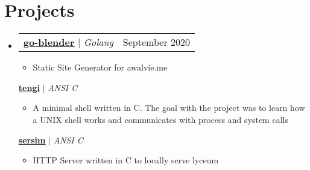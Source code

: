 \documentclass[letterpaper,11pt]{article}
\makeatletter
\newcommand{\resumeItem}[1]{
  \item\small{
    {#1 \vspace{-2pt}}
  }
}
\newcommand{\resumeProjectHeading}[2]{
    \item
    \begin{tabular*}{0.97\textwidth}{l@{\extracolsep{\fill}}r}
      \small#1 & #2 \\
    \end{tabular*}\vspace{-7pt}
}
\newcommand{\resumeSubHeadingListStart}{\begin{itemize}[leftmargin=0.15in, label={}]}
\newcommand{\resumeSubHeadingListEnd}{\end{itemize}}
\newcommand{\resumeItemListStart}{\begin{itemize}}
\newcommand{\resumeItemListEnd}{\end{itemize}\vspace{-5pt}}
\makeatother
\begin{document}
\section{Projects}
    \resumeSubHeadingListStart
	 	  \resumeProjectHeading
		  {\href{https://github.com/awalvie/go-blender}{\underline{\textbf{go-blender}}} $|$ \emph{Golang}}{September 2020}
		  \resumeItemListStart
			\resumeItem{Static Site Generator for awalvie.me}
		  \resumeItemListEnd
		  {\href{https://github.com/awalvie/tengi}{\underline{\textbf{tengi}}} $|$ \emph{ANSI C}}{}
		  \resumeItemListStart
			\resumeItem{A minimal shell written in C. The goal with the project was to learn how a UNIX shell works and communicates with process and system calls}
		  \resumeItemListEnd
		  {\href{https://github.com/awalvie/sersim}{\underline{\textbf{sersim}}} $|$ \emph{ANSI C}}{}
		  \resumeItemListStart
			\resumeItem{HTTP Server written in C to locally serve lyceum}
		  \resumeItemListEnd
    \resumeSubHeadingListEnd
\end{document}
